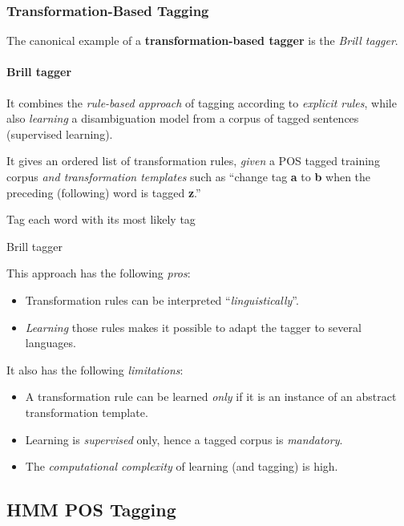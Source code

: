 \subsubsection{Transformation-Based Tagging}
The canonical example of a \textbf{transformation-based tagger} is the \emph{Brill tagger}.

\paragraph{Brill tagger}
It combines the \emph{rule-based approach} of tagging according to \emph{explicit rules}, while also \emph{learning} a disambiguation model from a corpus of tagged sentences (supervised learning).

It gives an ordered list of transformation rules, \emph{given} a POS tagged training corpus \emph{and transformation templates} such as ``change tag \textbf{a} to \textbf{b} when the preceding (following) word is tagged \textbf{z}.''
\begin{algorithm}[H]
	\DontPrintSemicolon
	\SetAlgoLined
	Tag each word with its most likely tag\;
	\caption{Brill tagger}
\end{algorithm}

This approach has the following \emph{pros}:
\begin{itemize}
	\item Transformation rules can be interpreted ``\emph{linguistically}''.
	\item \emph{Learning} those rules makes it possible to adapt the tagger to several languages.
\end{itemize}
It also has the following \emph{limitations}:
\begin{itemize}
	\item A transformation rule can be learned \emph{only} if it is an instance of an abstract transformation template.
	\item Learning is \emph{supervised} only, hence a tagged corpus is \emph{mandatory}.
	\item The \emph{computational complexity} of learning (and tagging) is high.
\end{itemize}

\subsection{HMM POS Tagging}
